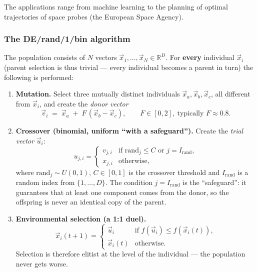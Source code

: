 \documentclass[11pt,a4paper]{article}
\theoremstyle{definition}
\providecommand{\uv}[1]{``#1''}
\begin{document}
The applications range from machine learning to the planning of optimal
trajectories of space probes (the European Space Agency).

\subsubsection{The DE/rand/1/bin algorithm}

The population consists of $N$ vectors
$\vec x_{1},\dots,\vec x_{N} \in \mathbb{R}^D$. For \textbf{every} individual
$\vec x_i$ (parent selection is thus trivial --- every individual becomes a
parent in turn) the following is performed:

\begin{enumerate}
\item \textbf{Mutation.} Select three mutually distinct individuals
  $\vec x_{a}, \vec x_{b}, \vec x_{c}$, all different from $\vec x_i$, and
  create the \emph{donor vector}
  \[
  \vec v_i \;=\; \vec x_{a} \;+\; F\,(\vec x_{b} - \vec x_{c}),
  \qquad F \in [0,2],\ \text{typically } F \approx 0.8 .
  \]
\item \textbf{Crossover (binomial, uniform \uv{with a safeguard}).}
  Create the \emph{trial vector} $\vec u_i$:
  \[
  u_{j,i} =
  \begin{cases}
  v_{j,i} & \text{if } \mathrm{rand}_j \le C \text{ or } j = I_{\mathrm{rand}},\\[2pt]
  x_{j,i} & \text{otherwise},
  \end{cases}
  \]
  where $\mathrm{rand}_j \sim U(0,1)$, $C \in [0,1]$ is the crossover threshold
  and $I_{\mathrm{rand}}$ is a random index from $\{1,\dots,D\}$. The condition
  $j = I_{\mathrm{rand}}$ is the \uv{safeguard}: it guarantees that at least one
  component comes from the donor, so the offspring is never an identical copy of
  the parent.
\item \textbf{Environmental selection (a 1:1 duel).}
  \[
  \vec x_i(t+1) =
  \begin{cases}
  \vec u_i & \text{if } f(\vec u_i) \le f(\vec x_i(t)),\\
  \vec x_i(t) & \text{otherwise.}
  \end{cases}
  \]
  Selection is therefore elitist at the level of the individual --- the
  population never gets worse.
\end{enumerate}
\end{document}
